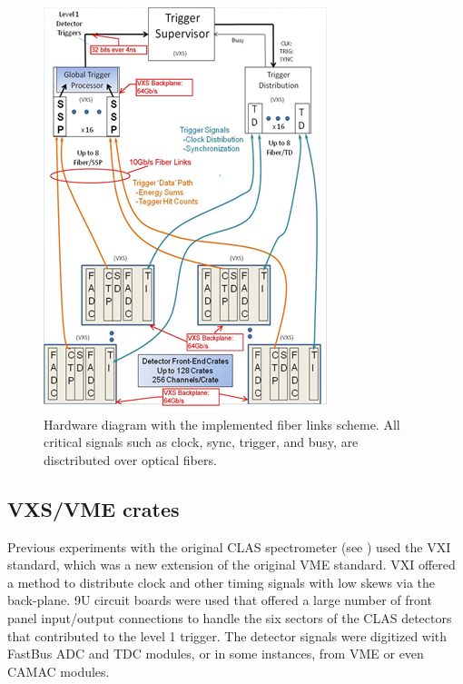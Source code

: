 \begin{figure}[hbt]
	\centering
	\includegraphics[width=1.0\columnwidth,keepaspectratio]{img/hardware_diagram.png}
	\caption{Hardware diagram with the implemented fiber links scheme. All critical signals such as clock, sync, trigger, and busy, are disctributed over optical fibers.}
	\label{fig:hardwarediagram}
\end{figure}


\subsection{VXS/VME crates}

Previous experiments with the original CLAS spectrometer (see \cite{clas-nim}) used the VXI standard, which was a new extension of the original VME standard. VXI offered a method to distribute clock and other timing signals with low skews via the back-plane. 9U circuit boards were used that offered a large number of front panel input/output connections to handle the six sectors of the CLAS detectors that contributed to the level 1 trigger. The detector signals were digitized with FastBus ADC and TDC modules, or in some instances, from VME or even CAMAC modules. 

